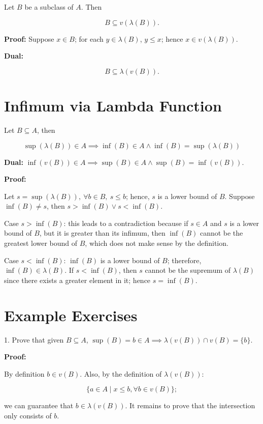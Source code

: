 Let \(B\) be a subclass of \(A\). Then

\[
	B \subseteq v(\lambda(B)).
\]

\textbf{Proof:} Suppose \(x \in B\); for each \(y \in \lambda(B)\), \(y \leq x\); hence \(x \in v(\lambda(B))\).

\QED

\textbf{Dual:}

\[
	B \subseteq \lambda(v(B)).
\]

\section{Infimum via Lambda Function}

Let \(B \subseteq A\), then

\[
	\sup(\lambda(B)) \in A \implies \inf(B) \in A \land \inf(B) = \sup(\lambda(B))
\]

\textbf{Dual:} \(\inf(v(B)) \in A \implies \sup(B) \in A \land \sup(B) = \inf(v(B))\).

\textbf{Proof:}

Let \(s = \sup(\lambda(B)),\ \forall b \in B,\ s \le b\); hence, \(s\) is a lower bound of \(B\). Suppose \(\inf(B) \neq s\), then \(s > \inf(B) \lor s < \inf(B)\).

Case \(s > \inf(B)\): this leads to a contradiction because if \(s \in A\) and \(s\) is a lower bound of \(B\), but it is greater than its infimum, then
\(\inf(B)\) cannot be the greatest lower bound of \(B\), which does not make sense by the definition.

Case \(s < \inf(B)\): \(\inf(B)\) is a lower bound of \(B\); therefore, \(\inf(B) \in \lambda(B)\). If \(s < \inf(B)\), then \(s\) cannot be the supremum
of \(\lambda(B)\) since there exists a greater element in it; hence \(s = \inf(B)\).

\QED

\section{Example Exercises}

1. Prove that given \(B \subseteq A\), \(\sup(B) = b \in A \implies \lambda(v(B)) \cap v(B) = \{b\}\).

\textbf{Proof:}

By definition \(b \in v(B)\). Also, by the definition of \(\lambda(v(B))\):

\[
	\{a \in A \mid x \le b, \forall b \in v(B)\};
\]

we can guarantee that \(b \in \lambda(v(B))\). It remains to prove that the intersection only consists of \(b\).


